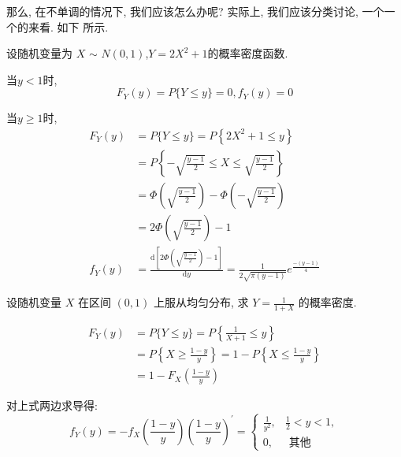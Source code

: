 那么, 在不单调的情况下, 我们应该怎么办呢? 实际上, 我们应该分类讨论, 一个一个的来看. 如下
所示. 

\begin{example}
  设随机变量为 $X$ $\sim$ $N (0, 1)$,$Y = 2X^2+1$的概率密度函数.
\end{example}

\begin{solution}
  当$y < 1$时,
    \[ F_Y(y) = P\{Y \leq y \} = 0,f_Y(y) = 0\]

    \quad 当$y \geq 1$时, 
    \begin{align*}
    F_Y(y) & =  P\{Y \leq y\}=P\left\{2 X^2+1 \leq y\right\} \\
    & =P\left\{-\sqrt{\frac{y-1}{2}} \leq X\right.  \left.\leq \sqrt{\frac{y-1}{2}}\right\}\\
    &=\Phi\left(\sqrt{\frac{y-1}{2}}\right)-\Phi\left(-\sqrt{\frac{y-1}{2}}\right) \\
    & =2 \Phi\left(\sqrt{\frac{y-1}{2}}\right)-1\\
    f_Y(y) &= \frac{\mathrm{d}[2\Phi(\sqrt{\frac{y-1}{2}}) - 1]}{\mathrm{d}y} = \frac{1}{2\sqrt{\pi(y-1)}}e^{\frac{-(y-1)}{4}}
    \end{align*}
\end{solution}

\begin{example}
  设随机变量 $X$ 在区间 $(0,1)$ 上服从均匀分布, 求 $Y=\frac{1}{1+X}$ 的概率密度.
\end{example}
\begin{solution}
  $$
\begin{aligned}
F_Y(y) & =P\{Y \leq y\}=P\left\{\frac{1}{X+1} \leq y\right\} \\
& =P\left\{X \geq \frac{1-y}{y}\right\}=1-P\left\{X \leq \frac{1-y}{y}\right\} \\
& =1-F_X\left(\frac{1-y}{y}\right)
\end{aligned}
$$

对上式两边求导得:
$$
f_Y(y)=-f_X\left(\frac{1-y}{y}\right)\left(\frac{1-y}{y}\right)^{\prime}= \begin{cases}\frac{1}{y^2}, & \frac{1}{2}<y<1, \\ 0, & \text { 其他 }\end{cases}
$$
\end{solution}

